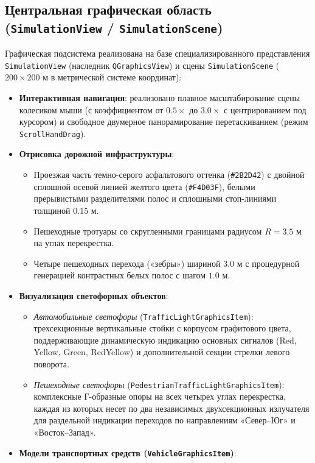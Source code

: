\documentclass[11pt, a4paper]{article}
\begin{document}
\subsection{Центральная графическая область (\texttt{SimulationView} / \texttt{SimulationScene})}
Графическая подсистема реализована на базе специализированного представления \texttt{SimulationView} (наследник \texttt{QGraphicsView}) и сцены \texttt{SimulationScene} ($200 \times 200\text{ м}$ в метрической системе координат):
\begin{itemize}
  \item \textbf{Интерактивная навигация}: реализовано плавное масштабирование сцены колесиком мыши (с коэффициентом от $0.5\times$ до $3.0\times$ с центрированием под курсором) и свободное двумерное панорамирование перетаскиванием (режим \texttt{ScrollHandDrag}).
  \item \textbf{Отрисовка дорожной инфраструктуры}:
  \begin{itemize}
    \item Проезжая часть темно-серого асфальтового оттенка (\texttt{\#2B2D42}) с двойной сплошной осевой линией желтого цвета (\texttt{\#F4D03F}), белыми прерывистыми разделителями полос и сплошными стоп-линиями толщиной $0.15\text{ м}$.
    \item Пешеходные тротуары со скругленными границами радиусом $R = 3.5\text{ м}$ на углах перекрестка.
    \item Четыре пешеходных перехода («зебры») шириной $3.0\text{ м}$ с процедурной генерацией контрастных белых полос с шагом $1.0\text{ м}$.
  \end{itemize}
  \item \textbf{Визуализация светофорных объектов}:
  \begin{itemize}
    \item \textit{Автомобильные светофоры} (\texttt{TrafficLightGraphicsItem}): трехсекционные вертикальные стойки с корпусом графитового цвета, поддерживающие динамическую индикацию основных сигналов (Red, Yellow, Green, RedYellow) и дополнительной секции стрелки левого поворота.
    \item \textit{Пешеходные светофоры} (\texttt{PedestrianTrafficLightGraphicsItem}): комплексные Г-образные опоры на всех четырех углах перекрестка, каждая из которых несет по два независимых двухсекционных излучателя для раздельной индикации переходов по направлениям «Север--Юг» и «Восток--Запад».
  \end{itemize}
  \item \textbf{Модели транспортных средств (\texttt{VehicleGraphicsItem})}:

\end{itemize}
\end{document}
